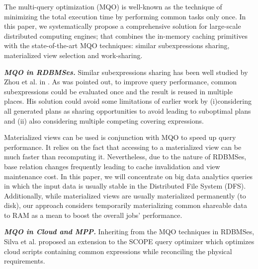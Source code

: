 The multi-query optimization (MQO) is well-known as the technique of minimizing the total execution time by performing common tasks only once. In this paper, we systematically propose a comprehensive solution for large-scale distributed computing engines; that combines the in-memory caching primitives with the state-of-the-art MQO techniques: similar subexpressions sharing, materialized view selection and work-sharing.

\emph{\textbf{MQO in RDBMSes.}} Similar subexpressions sharing has been well studied by Zhou et al. in \cite{zhou2007efficient}. As was pointed out, to improve query performance, common subexpressions could be evaluated once and the result is reused in multiple places. His solution could avoid some limitations of earlier work \cite{finkelstein1982common, roy2000efficient} by (i)considering all generated plans as sharing opportunities to avoid leading to suboptimal plans and (ii) also considering multiple competing covering expressions. 



Materialized views can be used is conjunction with MQO to speed up query performance. It relies on the fact that accessing to a materialized view can be much faster than recomputing it. Nevertheless, due to the nature of RDBMSes, base relation changes frequently leading to cache invalidation and view maintenance cost. In this paper, we will concentrate on big data analytics queries in which the input data is usually stable in the Distributed File System (DFS). Additionally, while materialized views are usually materialized permanently (to disk), our approach considers temporarily materializing common shareable data to RAM as a mean to boost the overall jobs' performance.

\emph{\textbf{MQO in Cloud and MPP.}} Inheriting from the MQO techniques in RDBMSes, Silva et al. \cite{silva2012exploiting} proposed an extension to the SCOPE query optimizer which optimizes cloud scripts containing common expressions while reconciling the physical requirements.

